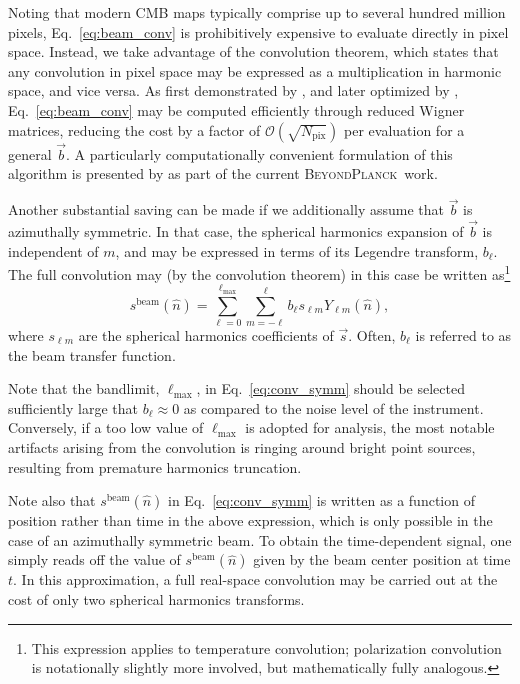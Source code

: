 \documentclass[twocolumn]{aa}
\newcommand{\s}[0]{\vec{s}}
\renewcommand{\b}[0]{\vec{b}}
\newcommand{\BP}{\textsc{BeyondPlanck}}
\begin{document}
Noting that modern CMB maps typically comprise up to several hundred
million pixels, Eq.~\eqref{eq:beam_conv} is prohibitively expensive to
evaluate directly in pixel space. Instead, we take advantage of the
convolution theorem, which states that any convolution in pixel space
may be expressed as a multiplication in harmonic space, and vice
versa. As first demonstrated by \citet{wandelt:2001}, and later
optimized by \citet{prezeau:2010}, Eq.~\eqref{eq:beam_conv} may be
computed efficiently through reduced Wigner matrices, reducing the
cost by a factor of $\mathcal{O}(\sqrt{N_{\mathrm{pix}}})$ per
evaluation for a general $\b$. A particularly computationally
convenient formulation of this algorithm is presented by \citet{bp08}
as part of the current \BP\ work.

Another substantial saving can be made if we additionally assume that
$\b$ is azimuthally symmetric. In that case, the spherical harmonics
expansion of $\b$ is independent of $m$, and may be expressed in terms
of its Legendre transform, $b_{\ell}$. The full convolution may (by
the convolution theorem) in this case be written as\footnote{This expression
  applies to temperature convolution; polarization convolution is
  notationally slightly more involved, but mathematically fully
  analogous.}
\begin{equation}
s^{\mathrm{beam}}(\hat{n}) =
\sum_{\ell=0}^{\ell_{\mathrm{max}}}\sum_{m=-\ell}^{\ell} b_{\ell}
s_{\ell m} Y_{\ell m}(\hat{n}),
\label{eq:conv_symm}
\end{equation}
where $s_{\ell m}$ are the spherical harmonics coefficients of
$\s$. Often, $b_{\ell}$ is referred to as the beam transfer function.

Note that the bandlimit, $\ell_{\mathrm{max}}$, in
Eq.~\eqref{eq:conv_symm} should be selected sufficiently large that
$b_{\ell} \approx 0$ as compared to the noise level of the
instrument. Conversely, if a too low value of $\ell_{\mathrm{max}}$ is
adopted for analysis, the most notable artifacts arising from the
convolution is ringing around bright point sources, resulting from
premature harmonics truncation.

Note also that $s^{\mathrm{beam}}(\hat{n})$ in Eq.~\eqref{eq:conv_symm}
is written as a function
of position rather than time in the above expression, which is only
possible in the case of an azimuthally symmetric beam. To obtain the
time-dependent signal, one simply reads off the value of
$s^{\mathrm{beam}}(\hat{n})$ given by the beam center position at
time $t$. In this approximation, a full real-space convolution may be
carried out at the cost of only two spherical harmonics transforms. 
\end{document}
